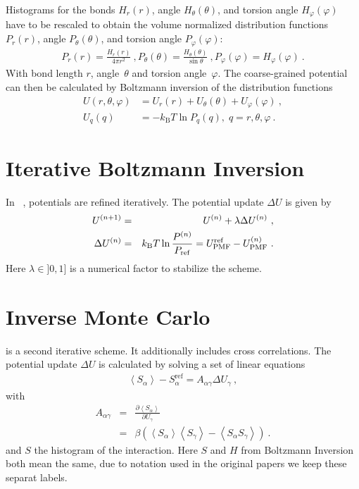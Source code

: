 Histograms for the bonds $H_r(r)$, angle $H_\theta(\theta)$, and torsion angle $H_\varphi(\varphi)$ have to be rescaled to obtain the volume normalized distribution functions $P_r(r)$, angle $P_\theta(\theta)$, and torsion angle $P_\varphi(\varphi)$: 
%
\begin{align}
    P_r(r) = \frac{H_r(r)}{4\pi r^2}~,
    P_\theta(\theta) = \frac{H_\theta(\theta)}{\sin \theta}~,
    P_\varphi(\varphi) = H_\varphi (\varphi)~.
    \label{eq:boltzmann_norm}
\end{align}
With bond length $r$, angle~$\theta$ and torsion angle~$\varphi$.%
The coarse-grained potential can then be calculated by Boltzmann inversion of the distribution functions
%
\begin{align}
    \label{eq:boltzmann_pmf}
    U({r}, \theta, \varphi) &= U_r({r}) + U_{\theta}(\theta) + U_{\varphi}(\varphi)~, \\
    U_q({q}) &= - k_\text{B} T \ln P_q( q ),\; q=r, \theta, \varphi~.
    \nonumber
\end{align}


\section{Iterative Boltzmann Inversion}
\label{sec:ibi}

In \ibi~\cite{Reith:2003}, potentials are refined iteratively. The potential update $\Delta U$ is given by
\begin{eqnarray}
  \label{eq:iter_boltzmann}
  U^{(n+1)} &=& U^{(n)} + \lambda \Delta U^{(n)}~, \\
  \Delta U^{(n)} &=&  k_\text{B} T \ln  \frac{P^{(n)}}{P_{\rm ref}}
  =  U_\text{PMF}^\text{ref} - U_\text{PMF}^{(n)}~.
\end{eqnarray}
Here $\lambda \in ]0,1]$ is a numerical factor to stabilize the scheme.

\section{Inverse Monte Carlo}
\label{sec:imc}

\imc is a second iterative scheme. It additionally includes cross correlations. The potential update $\Delta U$ is calculated by solving a set of linear equations
\begin{align}
    \left<S_{\alpha}\right> - S_{\alpha}^{\text{ref}}= A_{\alpha \gamma} \Delta U_{\gamma}~,
  \label{eq:imc}
\end{align}
%
with
\begin{eqnarray}
  \label{eq:covariance}
  A_{\alpha \gamma} &=& \frac{\partial \left< S_{\alpha} \right> }{\partial U_{\gamma}}  \\
  \nonumber
  &=&
  \beta \left( \left<S_{\alpha} \right>\left<S_{\gamma} \right> - \left<S_{\alpha} S_{\gamma} \right>  \right)~.
  \nonumber
\end{eqnarray}
and $S$ the histogram of the interaction. Here $S$ and $H$ from Boltzmann Inversion both mean the same, due to notation used in the original papers we keep these separat labels.

